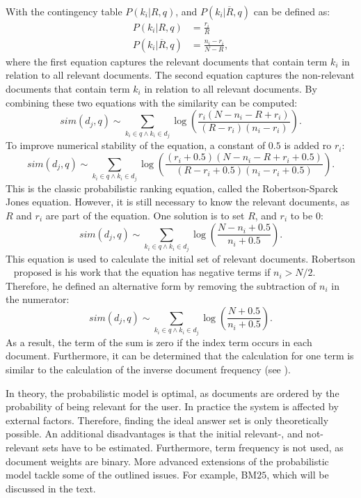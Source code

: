 With the contingency table $P(k_i|R, q)$, and $P(k_i|\overline{R}, q)$ can be defined as:
\begin{align}
  P(k_i|R, q) & = \frac{r_i}{R} \\
  P(k_i|\overline{R}, q) & = \frac{n_i - r_i}{N - R},
\end{align}
where the first equation captures the relevant documents that contain term $k_i$ in relation to all relevant documents. The second equation captures the non-relevant documents that contain term $k_i$ in relation to all relevant documents. By combining these two equations with  the similarity can be computed:
\begin{equation}
  sim(d_{j}, q) \sim \sum_{k_i \in q \wedge k_i \in d_j} \log \left(\frac{r_i(N - n_i - R + r_i)}{(R - r_i)(n_i - r_i)}\right).
\end{equation}
To improve numerical stability of the equation, a constant of $0.5$ is added ro $r_i$:
\begin{equation}
  sim(d_{j}, q) \sim \sum_{k_i \in q \wedge k_i \in d_j} \log \left(\frac{(r_i + 0.5)(N - n_i - R + r_i + 0.5)}{(R - r_i + 0.5)(n_i - r_i + 0.5)}\right).
\end{equation}
This is the classic probabilistic ranking equation, called the Robertson-Sparck Jones equation. However, it is still necessary to know the relevant documents, as $R$ and $r_i$ are part of the equation. One solution is to set $R$, and $r_i$ to be $0$:
\begin{equation}
  \label{similarity_porbabilistic_no_relevant}
  sim(d_{j}, q) \sim \sum_{k_i \in q \wedge k_i \in d_j} \log \left(\frac{N - n_i + 0.5}{n_i + 0.5}\right).
\end{equation}
This equation is used to calculate the initial set of relevant documents. Robertson ~\cite{robertson04idf} proposed is his work that the equation has negative terms if $n_i > N/2$. Therefore, he defined an alternative form by removing the subtraction of $n_i$ in the numerator:
\begin{equation}
  sim(d_{j}, q) \sim \sum_{k_i \in q \wedge k_i \in d_j} \log \left(\frac{N + 0.5}{n_i + 0.5}\right).
\end{equation}
As a result, the term of the sum is zero if the index term occurs in each document. Furthermore, it can be determined that the calculation for one term is similar to the calculation of the inverse document frequency (see ).

In theory, the probabilistic model is optimal, as documents are ordered by the probability of being relevant for the user. In practice the system is affected by external factors. Therefore, finding the ideal answer set is only theoretically possible. An additional disadvantages is that the initial relevant-, and not-relevant sets have to be estimated. Furthermore, term frequency is not used, as document weights are binary. More advanced extensions of the probabilistic model tackle some of the outlined issues. For example, BM$25$, which will be discussed in the text.

